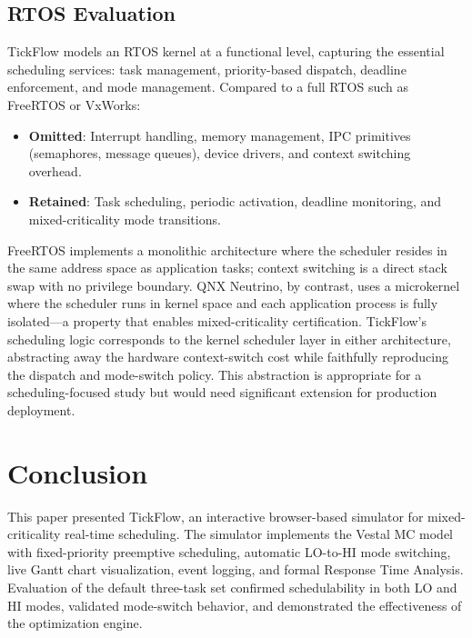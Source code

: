 \documentclass[conference]{IEEEtran}
\begin{document}
\subsection{RTOS Evaluation}
TickFlow models an RTOS kernel at a functional level, capturing the essential scheduling services: task management, priority-based dispatch, deadline enforcement, and mode management. Compared to a full RTOS such as FreeRTOS \cite{freertos} or VxWorks:
\begin{itemize}
  \item \textbf{Omitted}: Interrupt handling, memory management, IPC primitives (semaphores, message queues), device drivers, and context switching overhead.
  \item \textbf{Retained}: Task scheduling, periodic activation, deadline monitoring, and mixed-criticality mode transitions.
\end{itemize}
FreeRTOS implements a monolithic architecture where the scheduler resides in the same address space as application tasks; context switching is a direct stack swap with no privilege boundary. QNX Neutrino, by contrast, uses a microkernel where the scheduler runs in kernel space and each application process is fully isolated---a property that enables mixed-criticality certification. TickFlow's scheduling logic corresponds to the kernel scheduler layer in either architecture, abstracting away the hardware context-switch cost while faithfully reproducing the dispatch and mode-switch policy.
This abstraction is appropriate for a scheduling-focused study but would need significant extension for production deployment.

\section{Conclusion}

This paper presented TickFlow, an interactive browser-based simulator for mixed-criticality real-time scheduling. The simulator implements the Vestal MC model with fixed-priority preemptive scheduling, automatic LO-to-HI mode switching, live Gantt chart visualization, event logging, and formal Response Time Analysis. Evaluation of the default three-task set confirmed schedulability in both LO and HI modes, validated mode-switch behavior, and demonstrated the effectiveness of the optimization engine.
\end{document}
